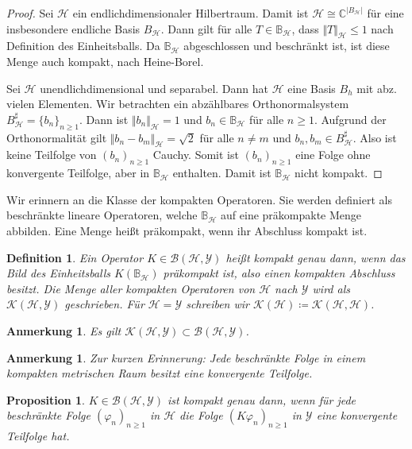 \documentclass[11pt, hidelinks]{article}
\newcommand{\h}{\mathcal{H}}
\newcommand{\on}{{n \geq 1}}
\numberwithin{conj}{section}
\newtheorem{definition}[conj]{Definition}
\newtheorem{remark}[conj]{Anmerkung}
\newtheorem{proposition}[conj]{Proposition}
\begin{document}
\begin{proof}
    Sei $\h$ ein endlichdimensionaler Hilbertraum. Damit ist $\h \cong \mathbb{C}^{\vert B_\h \vert}$ für eine insbesondere endliche Basis $B_\h$. Dann gilt für alle $T \in \mathbb{B}_\h$, dass $\Vert T \Vert_\h \leq 1$ nach Definition des Einheitsballs. Da $\mathbb{B}_\h$ abgeschlossen und beschränkt ist, ist diese Menge auch kompakt, nach Heine-Borel.

    Sei $\h$ unendlichdimensional und separabel. Dann hat $\h$ eine Basis $B_h$ mit abz. vielen Elementen. Wir betrachten ein abzählbares Orthonormalsystem $B^\sharp_\h = \{b_n\}_\on$. Dann ist $\Vert b_n \Vert_\h = 1$ und $b_n \in \mathbb{B}_\h$ für alle $n \geq 1$. Aufgrund der Orthonormalität gilt $\Vert b_n - b_m \Vert_\h = \sqrt{2}$ für alle $n \neq m$ und $b_n,b_m \in B^\sharp_\h$. Also ist keine Teilfolge von $(b_n)_\on$ Cauchy. Somit ist $(b_n)_\on$ eine Folge ohne konvergente Teilfolge, aber in $\mathbb{B}_\h$ enthalten. Damit ist $\mathbb{B}_\h$ nicht kompakt.
\end{proof}

Wir erinnern an die Klasse der kompakten Operatoren. Sie werden definiert als beschränkte lineare Operatoren, welche $\mathbb{B}_\h$ auf eine präkompakte Menge abbilden. Eine Menge heißt präkompakt, wenn ihr Abschluss kompakt ist.

\begin{definition}
    Ein Operator $K \in \mathcal{B}(\h,\mathcal{Y})$ heißt kompakt genau dann, wenn das Bild des Einheitsballs $K(\mathbb{B}_\h)$ präkompakt ist, also einen kompakten Abschluss besitzt. Die Menge aller kompakten Operatoren von $\h$ nach $\mathcal{Y}$ wird als $\mathcal{K}(\h,\mathcal{Y})$ geschrieben. Für $\h=\mathcal{Y}$ schreiben wir $\mathcal{K}(\h) \coloneq \mathcal{K}(\h,\h)$.
\end{definition}

\begin{remark}
    Es gilt $\mathcal{K}(\h,\mathcal{Y}) \subset \mathcal{B}(\h,\mathcal{Y})$.
\end{remark}

\begin{remark}
Zur kurzen Erinnerung: Jede beschränkte Folge in einem kompakten metrischen Raum besitzt eine konvergente Teilfolge.
\end{remark}

\begin{proposition}
    $K \in \mathcal{B}(\h,\mathcal{Y})$ ist kompakt genau dann, wenn für jede beschränkte Folge $(\varphi_n)_{n \geq 1}$ in $\h$ die Folge $(K\varphi_n)_{n \geq 1}$ in $\mathcal{Y}$ eine konvergente Teilfolge hat.
\end{proposition}
\end{document}
